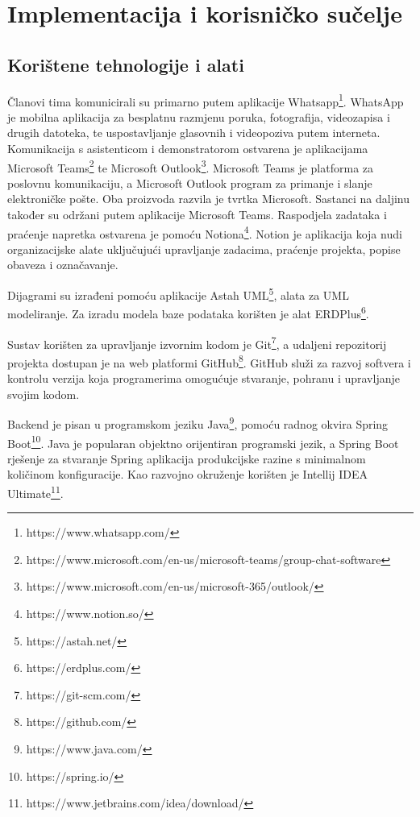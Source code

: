 \chapter{Implementacija i korisničko sučelje}
		
		
		\section{Korištene tehnologije i alati}
					
					
			Članovi tima komunicirali su primarno putem aplikacije Whatsapp\footnote{https://www.whatsapp.com/}. WhatsApp je mobilna aplikacija za besplatnu razmjenu poruka, fotografija, videozapisa i drugih datoteka, te uspostavljanje glasovnih i videopoziva putem interneta. Komunikacija s asistenticom i demonstratorom ostvarena je aplikacijama Microsoft Teams\footnote{https://www.microsoft.com/en-us/microsoft-teams/group-chat-software} te Microsoft Outlook\footnote{https://www.microsoft.com/en-us/microsoft-365/outlook/}. Microsoft Teams je platforma za poslovnu komunikaciju, a Microsoft Outlook program za primanje i slanje elektroničke pošte. Oba proizvoda razvila je tvrtka Microsoft. Sastanci na daljinu također su održani putem aplikacije Microsoft Teams. Raspodjela zadataka i praćenje napretka ostvarena je pomoću Notiona\footnote{https://www.notion.so/}. Notion je aplikacija koja nudi organizacijske alate uključujući upravljanje zadacima, praćenje projekta, popise obaveza i označavanje.
			
			Dijagrami su izrađeni pomoću aplikacije Astah UML\footnote{https://astah.net/}, alata za UML modeliranje. Za izradu modela baze podataka korišten je alat ERDPlus\footnote{https://erdplus.com/}.
			
			Sustav korišten za upravljanje izvornim kodom je Git\footnote{https://git-scm.com/}, a udaljeni repozitorij projekta dostupan je na web platformi GitHub\footnote{https://github.com/}. GitHub služi za razvoj softvera i kontrolu verzija koja programerima omogućuje stvaranje, pohranu i upravljanje svojim kodom.
			
			Backend je pisan u programskom jeziku Java\footnote{https://www.java.com/}, pomoću radnog okvira Spring Boot\footnote{https://spring.io/}. Java je popularan objektno orijentiran programski jezik, a Spring Boot rješenje za stvaranje Spring aplikacija produkcijske razine s minimalnom količinom konfiguracije. Kao razvojno okruženje korišten je Intellij IDEA Ultimate\footnote{https://www.jetbrains.com/idea/download/}.
			
